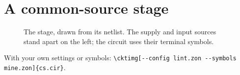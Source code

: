 \documentclass{article}
\begin{document}
\section*{A common-source stage}

\begin{figure}[h]
  \centering
  \caption{The stage, drawn from its netlist. The supply and input sources
    stand apart on the left; the circuit uses their terminal symbols.}
\end{figure}

With your own settings or symbols:
\verb|\cktimg[--config lint.zon --symbols mine.zon]{cs.cir}|.
\end{document}

